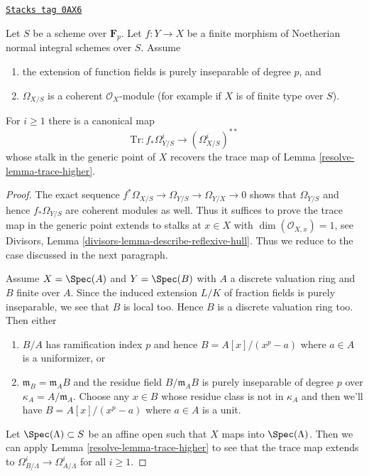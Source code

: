 \begin{lemma}
\label{resolve-lemma-trace-extends}
\href{https://stacks.math.columbia.edu/tag/0AX6}{\texttt{Stacks tag 0AX6}}

Let $S$ be a scheme over $\mathbf{F}_p$. Let $f : Y \to X$ be a finite morphism
of Noetherian normal integral schemes over $S$. Assume
\begin{enumerate}
\item the extension of function fields is purely inseparable of degree $p$, and
\item $\Omega_{X/S}$ is a coherent $\mathcal{O}_X$-module (for example
if $X$ is of finite type over $S$).
\end{enumerate}
For $i \geq 1$ there is a canonical map
$$
\text{Tr} : f_*\Omega^i_{Y/S} \longrightarrow (\Omega_{X/S}^i)^{**}
$$
whose stalk in the generic point of $X$ recovers the trace map of
Lemma \ref{resolve-lemma-trace-higher}.
\end{lemma}

\begin{proof}

The exact sequence $f^*\Omega_{X/S} \to \Omega_{Y/S} \to \Omega_{Y/X} \to 0$
shows that $\Omega_{Y/S}$ and hence $f_*\Omega_{Y/S}$ are coherent modules
as well. Thus it suffices to prove the trace map in the generic point
extends to stalks at $x \in X$ with $\dim(\mathcal{O}_{X, x}) = 1$, see
Divisors, Lemma \ref{divisors-lemma-describe-reflexive-hull}.
Thus we reduce to the case discussed in the next paragraph.

\medskip\noindent
Assume $X = \Spec(A)$ and $Y = \Spec(B)$ with $A$ a discrete valuation
ring and $B$ finite over $A$. Since the induced extension $L/K$
of fraction fields is purely inseparable, we see that $B$ is local too.
Hence $B$ is a discrete valuation ring too. Then either
\begin{enumerate}
\item $B/A$ has ramification index $p$ and hence $B = A[x]/(x^p - a)$
where $a \in A$ is a uniformizer, or
\item $\mathfrak m_B = \mathfrak m_A B$ and the residue field
$B/\mathfrak m_A B$ is purely inseparable of degree $p$ over
$\kappa_A = A/\mathfrak m_A$.
Choose any $x \in B$ whose residue class is not in $\kappa_A$
and then we'll have $B = A[x]/(x^p - a)$ where $a \in A$ is
a unit.
\end{enumerate}
Let $\Spec(\Lambda) \subset S$ be an affine open such that
$X$ maps into $\Spec(\Lambda)$. Then we can apply
Lemma \ref{resolve-lemma-trace-higher}
to see that the trace map extends to
$\Omega^i_{B/\Lambda} \to \Omega^i_{A/\Lambda}$
for all $i \geq 1$.
\end{proof}

